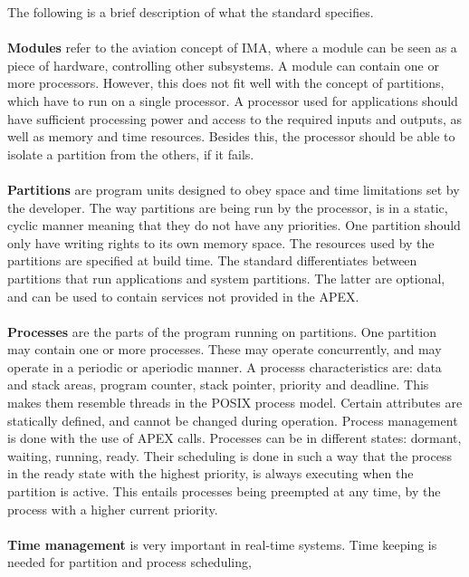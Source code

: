 The following is a brief description of what the standard specifies.
\\\\
\textbf{Modules}
refer to the aviation concept of IMA, where a module
can be seen as a piece of hardware, controlling other subsystems.
A module can contain one or more processors. However, this does not fit 
well with the concept of partitions,
which have to run on a single processor\cite{arinc_page_11}.
A processor used for \arinc{} applications should have sufficient processing
power and access to the required inputs and outputs,
as well as memory and time resources.
Besides this, the processor should be able to isolate a partition from
the others, if it fails\cite{arinc_page_12}.
\\\\
\textbf{Partitions}
are program units designed to obey space and time limitations
set by the developer. The way partitions are being run by the processor,
is in a static, cyclic manner meaning that they do not have any priorities.
One partition should only have writing rights to its own memory space\cite{arinc_page_13}.
The resources used by the partitions are specified at build time\cite{arinc_page_14}.
The standard differentiates between partitions that run applications and system partitions. The latter are optional, and can be used to contain
services not provided in the APEX\cite{arinc_scarlett}.
\\\\
\textbf{Processes}
are the parts of the program running on partitions. One partition
may contain one or more processes. These may operate concurrently,
and may operate in a periodic or aperiodic manner.
A process\textquotesingle s
characteristics are: data and stack areas, program counter, stack pointer,
priority and deadline. This makes them resemble threads in the POSIX
\cite{posix} process model.
Certain attributes are statically defined, and cannot
be changed during operation\cite{arinc_page_19}.
Process management is done with the use of APEX calls.
Processes can be in different states: dormant, waiting, running, ready.
Their scheduling is done in such a way that the process in the ready state
with the highest priority, is always executing when the partition is active.
This entails processes being preempted at any time, by the process with a
higher current priority\cite{arinc_page_20}.
\\\\
\textbf{Time management}
is very important in real-time systems.
Time keeping is needed for partition and process scheduling,

